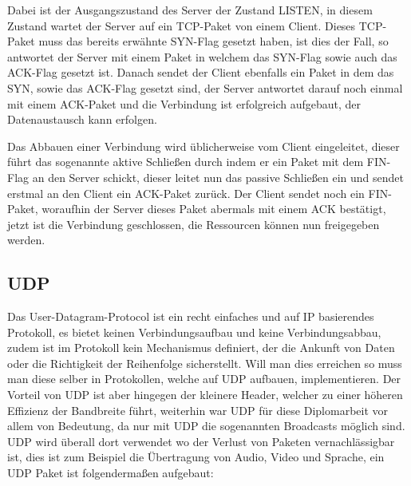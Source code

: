 \documentclass[a4paper,14pt,headsepline]{scrartcl}
\begin{document}
Dabei ist der Ausgangszustand des Server der Zustand LISTEN, in diesem Zustand wartet der Server auf ein TCP-Paket von einem Client. Dieses TCP-Paket muss das bereits erwähnte SYN-Flag gesetzt haben, ist dies der Fall, so antwortet der Server mit einem Paket in welchem das SYN-Flag sowie auch das ACK-Flag gesetzt ist. Danach sendet der Client ebenfalls ein Paket in dem das SYN, sowie das ACK-Flag gesetzt sind, der Server antwortet darauf noch einmal mit einem ACK-Paket und die Verbindung ist erfolgreich aufgebaut, der Datenaustausch kann erfolgen.

Das Abbauen einer Verbindung wird üblicherweise vom Client eingeleitet, dieser führt das sogenannte aktive Schließen durch indem er ein Paket mit dem FIN-Flag an den Server schickt, dieser leitet nun das passive Schließen ein und sendet erstmal an den Client ein ACK-Paket zurück. Der Client sendet noch ein FIN-Paket, woraufhin der Server dieses Paket abermals mit einem ACK bestätigt, jetzt ist die Verbindung geschlossen, die Ressourcen können nun freigegeben werden.

\newpage
\subsection{UDP}
Das User-Datagram-Protocol ist ein recht einfaches und auf IP basierendes Protokoll, es bietet keinen Verbindungsaufbau und keine Verbindungsabbau, zudem ist im Protokoll kein Mechanismus definiert, der die Ankunft von Daten oder die Richtigkeit der Reihenfolge sicherstellt. Will man dies erreichen so muss man diese selber in Protokollen, welche auf UDP aufbauen, implementieren. Der Vorteil von UDP ist aber hingegen der kleinere Header, welcher zu einer höheren Effizienz der Bandbreite führt, weiterhin war UDP für diese Diplomarbeit vor allem von Bedeutung, da nur mit UDP die sogenannten Broadcasts möglich sind. UDP wird überall dort verwendet wo der Verlust von Paketen vernachlässigbar ist, dies ist zum Beispiel die Übertragung von Audio, Video und Sprache, ein UDP Paket ist folgendermaßen aufgebaut:
\begin{figure}[h]
\begin{center}
\end{center}
\end{figure}
\end{document}
